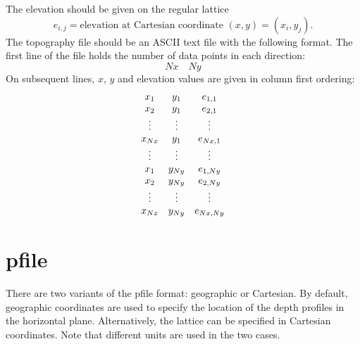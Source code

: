 \documentclass[11pt]{report}
\begin{document}
The elevation should be given on the regular lattice
\[
e_{i,j} = \mbox{elevation at Cartesian coordinate $(x,y)=(x_i, y_j)$.}
\]
The topography file should be an ASCII text file with the following format. The first line of the
file holds the number of data points in each direction:
\[
Nx\quad Ny
\]
On subsequent lines, $x$, $y$ and elevation values are given in column first ordering:
\[
\begin{array}{c c c}
x_1 & y_1& e_{1,1}\\
x_2& y_1& e_{2,1}\\
\vdots&\vdots&\vdots\\
x_{Nx}& y_1& e_{Nx,1}\\
\vdots&\vdots&\vdots\\
x_1 & y_{Ny}& e_{1,Ny}\\
x_2& y_{Ny}& e_{2,Ny}\\
\vdots&\vdots&\vdots\\
x_{Nx}& y_{Ny}& e_{Nx,Ny}
\end{array}
\]

\section{pfile}\label{sec:pfile-format}

There are two variants of the pfile format: geographic or Cartesian. By default, geographic
coordinates are used to specify the location of the depth profiles in the horizontal
plane. Alternatively, the lattice can be specified in Cartesian coordinates. Note that different
units are used in the two cases.
\end{document}
